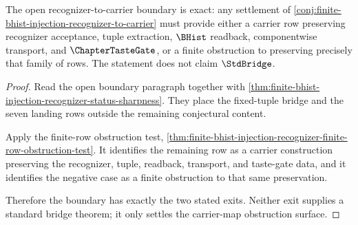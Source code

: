 \begin{theorem}
\label{thm:finite-bhist-injection-carrier-obstruction-restatement}
The open recognizer-to-carrier boundary is exact: any settlement of \autoref{conj:finite-bhist-injection-recognizer-to-carrier} must provide either a carrier row preserving recognizer acceptance, tuple extraction, $\BHist$ readback, componentwise transport, and $\ChapterTasteGate$, or a finite obstruction to preserving precisely that family of rows. The statement does not claim $\StdBridge$.
\end{theorem}
\begin{proof}
Read the open boundary paragraph together with \autoref{thm:finite-bhist-injection-recognizer-status-sharpness}. They place the fixed-tuple bridge and the seven landing rows outside the remaining conjectural content.

Apply the finite-row obstruction test, \autoref{thm:finite-bhist-injection-recognizer-finite-row-obstruction-test}. It identifies the remaining row as a carrier construction preserving the recognizer, tuple, readback, transport, and taste-gate data, and it identifies the negative case as a finite obstruction to that same preservation.

Therefore the boundary has exactly the two stated exits. Neither exit supplies a standard bridge theorem; it only settles the carrier-map obstruction surface.
\end{proof}

